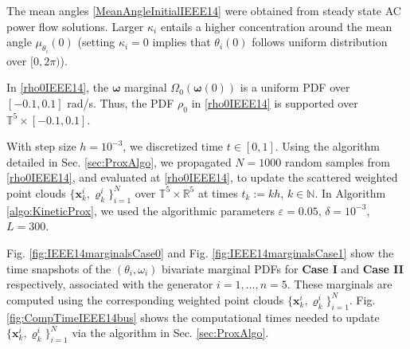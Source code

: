 \documentclass[10pt,twocolumn]{IEEEtran}
\begin{document}
The mean angles \eqref{MeanAngleInitialIEEE14} were obtained from steady state AC power flow solutions. Larger $\kappa_{i}$ entails a higher concentration around the mean angle $\mu_{\theta_{i}}(0)$ (setting $\kappa_i=0$ implies that $\theta_{i}(0)$ follows uniform distribution over $[0,2\pi)$).

In \eqref{rho0IEEE14}, the $\bm{\omega}$ marginal $ \Omega_{0}\left(\bm{\omega}(0)\right)$ is a uniform PDF over $[-0.1,0.1]$ rad/s. Thus, the PDF $\rho_0$ in \eqref{rho0IEEE14} is supported over $\mathbb{T}^{5}\times [-0.1,0.1]$.

With step size $h=10^{-3}$, we discretized time $t\in[0,1]$. Using the algorithm detailed in Sec. \ref{sec:ProxAlgo}, we propagated $N=1000$ random samples from \eqref{rho0IEEE14}, and evaluated at \eqref{rho0IEEE14}, to update the scattered weighted point clouds $\{\bm{x}_{k}^{i},\varrho_{k}^{i}\}_{i=1}^{N}$ over $\mathbb{T}^{5}\times\mathbb{R}^{5}$ at times $t_{k}:=kh$, $k\in\mathbb{N}$. In Algorithm \ref{algo:KineticProx}, we used the algorithmic parameters $\varepsilon=0.05$, $\delta=10^{-3}$, $L=300$.

Fig. \ref{fig:IEEE14marginalsCase0} and Fig. \ref{fig:IEEE14marginalsCase1} show the time snapshots of the $(\theta_{i},\omega_{i})$ bivariate marginal PDFs for \textbf{Case I} and \textbf{Case II} respectively, associated with the generator $i=1,\hdots, n=5$. These marginals are computed using the corresponding weighted point clouds $\{\bm{x}_{k}^{i},\varrho_{k}^{i}\}_{i=1}^{N}$. %
Fig. \ref{fig:CompTimeIEEE14bus} shows the computational times needed to update $\{\bm{x}_{k}^{i},\varrho_{k}^{i}\}_{i=1}^{N}$ via the algorithm in Sec.  \ref{sec:ProxAlgo}.  
\end{document}
